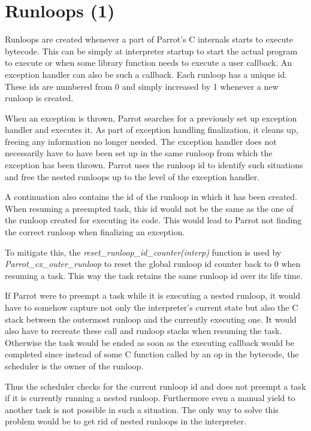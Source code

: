 \documentclass[bachelor,english]{hgbthesis}
\begin{document}
\section{Runloops (1)}

Runloops are created whenever a part of Parrot's C internals starts to execute bytecode. This can be simply at interpreter startup to start the actual program to execute or when some library function needs to execute a user callback. An exception handler can also be such a callback. Each runloop has a unique id. These ids are numbered from 0 and simply increased by 1 whenever a new runloop is created.

When an exception is thrown, Parrot searches for a previously set up exception handler and executes it. As part of exception handling finalization, it cleans up, freeing any information no longer needed. The exception handler does not necessarily have to have been set up in the same runloop from which the exception has been thrown. Parrot uses the runloop id to identify such situations and free the nested runloops up to the level of the exception handler.

A continuation also contains the id of the runloop in which it has been created. When resuming a preempted task, this id would not be the same as the one of the runloop created for executing its code. This would lead to Parrot not finding the correct runloop when finalizing an exception.

To mitigate this, the \textit{reset\_runloop\_id\_counter(interp)} function is used by \textit{Parrot\_cx\_outer\_runloop} to reset the global runloop id counter back to 0 when resuming a task. This way the task retains the same runloop id over its life time.

If Parrot were to preempt a task while it is executing a nested runloop, it would have to somehow capture not only the interpreter's current state but also the C stack between the outermost runloop and the currently executing one. It would also have to recreate these call and runloop stacks when resuming the task. Otherwise the task would be ended as soon as the executing callback would be completed since instead of some C function called by an op in the bytecode, the scheduler is the owner of the runloop.

Thus the scheduler checks for the current runloop id and does not preempt a task if it is currently running a nested runloop. Furthermore even a manual yield to another task is not possible in such a situation. The only way to solve this problem would be to get rid of nested runloops in the interpreter.
\end{document}
